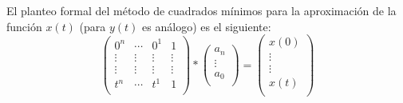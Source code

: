 El planteo formal del método de cuadrados mínimos para la aproximación de la función $x(t)$ (para $y(t)$ es análogo) es el siguiente:
\begin{displaymath}
\begin{pmatrix}
  0^n & \cdots    & 0^1 & 1	\\
  \vdots &  \vdots &  \vdots & \vdots  \\ 
  \vdots &  \vdots &  \vdots & \vdots  \\ 
  t^n & \cdots & t^1 & 1\\
\end{pmatrix}
*
\begin{pmatrix}
 a_n\\
 \vdots\\
 a_0\\
\end{pmatrix}
 =
\begin{pmatrix}
  x(0)\\
  \vdots \\
  \vdots \\
  x(t)\\ 
\end{pmatrix} 
\end{displaymath}

